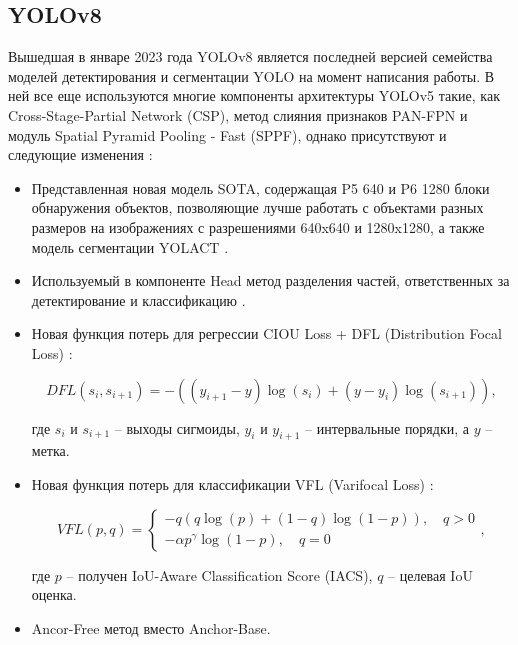 \subsection{YOLOv8}

Вышедшая в январе 2023 года YOLOv8 является последней версией семейства моделей детектирования и сегментации YOLO на момент написания работы. В ней все еще используются многие компоненты архитектуры YOLOv5 такие, как Cross-Stage-Partial Network (CSP), метод слияния признаков PAN-FPN и модуль Spatial Pyramid Pooling - Fast (SPPF), однако присутствуют и следующие изменения \cite{6-1}:

\begin{itemize}

    \item Представленная новая модель SOTA, содержащая P5 640 и P6 1280 блоки обнаружения объектов, позволяющие лучше работать с объектами разных размеров на изображениях с разрешениями 640x640 и 1280x1280, а также модель сегментации YOLACT \cite{6-2}.

    \item Используемый в компоненте Head метод разделения частей, ответственных за детектирование и классификацию \cite{6-3}.

    \item Новая функция потерь для регрессии CIOU Loss + DFL (Distribution Focal Loss) \cite{6-4}:

    \begin{equation}
        DFL(s_i, s_{i+1}) = -((y_{i+1}-y)\log(s_i) + (y-y_i)\log(s_{i+1})),
    \end{equation}

    \noindent где $s_i$ и $s_{i+1}$ -- выходы сигмоиды, $y_i$ и $y_{i+1}$ -- интервальные порядки, а $y$ -- метка.

    \item Новая функция потерь для классификации VFL (Varifocal Loss) \cite{6-5}:

    \begin{equation}
        VFL(p, q) = 
        \begin{cases}
            -q(q\log(p)+(1-q)\log(1-p)), \quad q>0 \\
            -\alpha p^{\gamma} \log(1-p), \quad q=0
        \end{cases},
    \end{equation}

    \noindent где $p$ -- получен IoU-Aware Classification Score (IACS), $q$ -- целевая IoU оценка.

    \item Ancor-Free метод вместо Anchor-Base.
    
\end{itemize}

